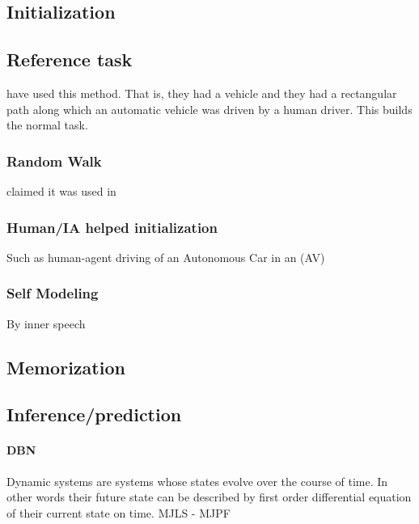 \documentclass{article}
\begin{document}
			\subsection{Initialization}
				\subsection{Reference task} \cite{regazzoni-2020-multi-sensorial-generative-and-descriptive-self-awareness-models-for-autonomous-systems,kanapram-2019-dynamic-bayesian-approach-for-decision-making-in-ego-things,kanapram-2019-self-awareness-in-intelligent-vehicles-experience-based-abnormality-detection,kanapram-2020-collective-awareness-for-abnormality-detection-in-connected-autonomous-vehicles,baydoun-2018-learning-switching-models-for-abnormality-detection-for-autonomous-driving} have used this method. That is, they had a vehicle and they had a rectangular path along which an automatic vehicle was driven by a human driver. This builds the normal task. 
				\subsubsection{Random Walk} \cite{regazzoni-2020-multi-sensorial-generative-and-descriptive-self-awareness-models-for-autonomous-systems} claimed it was used in \citep{kanapram-2019-dynamic-bayesian-approach-for-decision-making-in-ego-things}
				\subsubsection{Human/IA helped initialization} Such as human-agent driving of an Autonomous Car in an (AV)
				\subsubsection{Self Modeling}
				\citet{bellman-2017-self-modeling-and-self-awareness}
				\citet{kwiatkowski-2019-zero-shot-learning-on-simulated-robots}	
				\citet{kwiatkowski-2019-task-agnostic-self-modeling-machines}
				By inner speech \cite{chella-2020-developing-self-awareness-in-robots-via-inner-speech}
			\subsection{Memorization}
			\subsection{Inference/prediction}
				\paragraph{DBN} 
				Dynamic systems are systems whose states evolve over the course of time. In other words their future state can be described by first order differential equation of their current state on time. MJLS - MJPF \citep{baydoun-2018-learning-switching-models-for-abnormality-detection-for-autonomous-driving}
\end{document}
